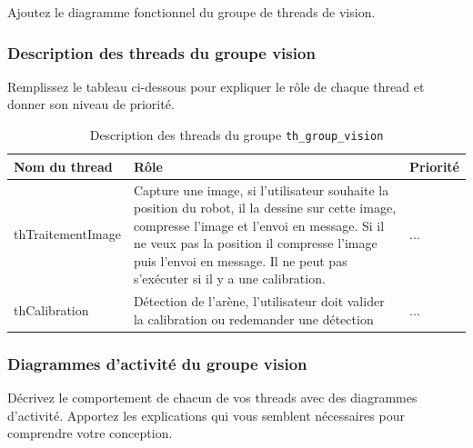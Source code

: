 \documentclass[11pt, a4paper]{paper}
\begin{document}
{\color{blue} Ajoutez le diagramme fonctionnel du groupe de threads de vision.}

\subsubsection{Description des threads du groupe vision}
{\color{red} Remplissez le tableau ci-dessous pour expliquer le rôle de chaque thread et donner son niveau de priorité.}


\begin{table}[htp]
\caption{Description des threads du groupe {\tt th\_group\_vision}}
\begin{center}
\begin{tabular}{|p{3cm}|p{8.5cm}|p{2cm}|}
\hline
\bf Nom du thread &	\bf Rôle &	\bf Priorité \\
\hline
\hline
\color{black}thTraitementImage &	\color{black}Capture une image, si l'utilisateur souhaite la position du robot, il la dessine sur cette image, compresse l'image et l'envoi en message. Si il ne veux pas la position il compresse l'image puis l'envoi en message. Il ne peut pas s'exécuter si il y a une calibration. &	\color{blue}...\\
\hline
\color{black}thCalibration &	\color{black}Détection de l'arène, l'utilisateur doit valider la calibration ou redemander une détection &	\color{blue}...\\
\hline
\end{tabular}
\end{center}
\label{tab:gt_moniteur}
\end{table}%
\FloatBarrier

\subsubsection{Diagrammes d'activité du groupe vision}
{\color{blue}Décrivez le comportement de chacun de vos threads avec des diagrammes d'activité. Apportez les explications qui vous semblent nécessaires pour comprendre votre conception.}
\end{document}
